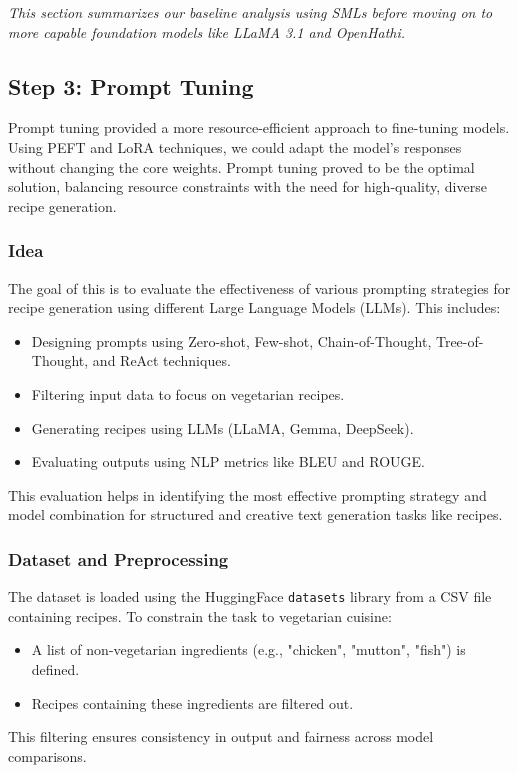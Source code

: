 \documentclass[letterpaper,11pt]{report}
\begin{document}
\textit{This section summarizes our baseline analysis using SMLs before moving on to more capable foundation models like LLaMA 3.1 and OpenHathi.}


\subsection{Step 3: Prompt Tuning}

Prompt tuning provided a more resource-efficient approach to fine-tuning models. Using PEFT and LoRA techniques, we could adapt the model’s responses without changing the core weights.
Prompt tuning proved to be the optimal solution, balancing resource constraints with the need for high-quality, diverse recipe generation.


\subsubsection{Idea}
The goal of this is to evaluate the effectiveness of various prompting strategies for recipe generation using different Large Language Models (LLMs). This includes:
\begin{itemize}
  \item Designing prompts using Zero-shot, Few-shot, Chain-of-Thought, Tree-of-Thought, and ReAct techniques.
  \item Filtering input data to focus on vegetarian recipes.
  \item Generating recipes using LLMs (LLaMA, Gemma, DeepSeek).
  \item Evaluating outputs using NLP metrics like BLEU and ROUGE.
\end{itemize}

This evaluation helps in identifying the most effective prompting strategy and model combination for structured and creative text generation tasks like recipes.

\subsubsection{Dataset and Preprocessing}
The dataset is loaded using the HuggingFace \texttt{datasets} library from a CSV file containing recipes. To constrain the task to vegetarian cuisine:
\begin{itemize}
  \item A list of non-vegetarian ingredients (e.g., "chicken", "mutton", "fish") is defined.
  \item Recipes containing these ingredients are filtered out.
\end{itemize}
This filtering ensures consistency in output and fairness across model comparisons.
\end{document}
